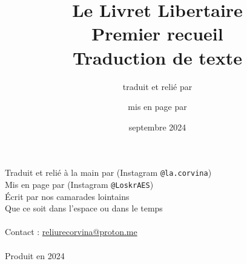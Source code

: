 \usepackage[placement=center,angle=45,color=black!35,scale=4]{background}


\title{Le Livret Libertaire\\[2em]\large Premier recueil\\[2em]\large Traduction de texte}
\author{\normalsize traduit et relié par  \and \normalsize mis en page par }
\date{septembre 2024}



 
\fontsize{12}{15}\selectfont

\afterpage{\blankpage[-4]}
\afterpage{\blankpage}
\afterpage{\blankpage}
\afterpage{\blankpage}

\frontmatter
\maketitle

\begin{flushleft}
	\vspace*{\fill}
	\small

	Traduit et relié à la main par  (Instagram \texttt{@la.corvina})\\
	Mis en page par  (Instagram \texttt{@LoskrAES})\\
	Écrit par nos camarades lointains\\
	Que ce soit dans l’espace ou dans le temps\\
	~\\
	Contact : \href{mailto:reliurecorvina@proton.me}{reliurecorvina@proton.me}\\
	~\\
	Produit en 2024
\end{flushleft}




\fontsize{11}{12}\selectfont
{}
\fontsize{12}{15}\selectfont

